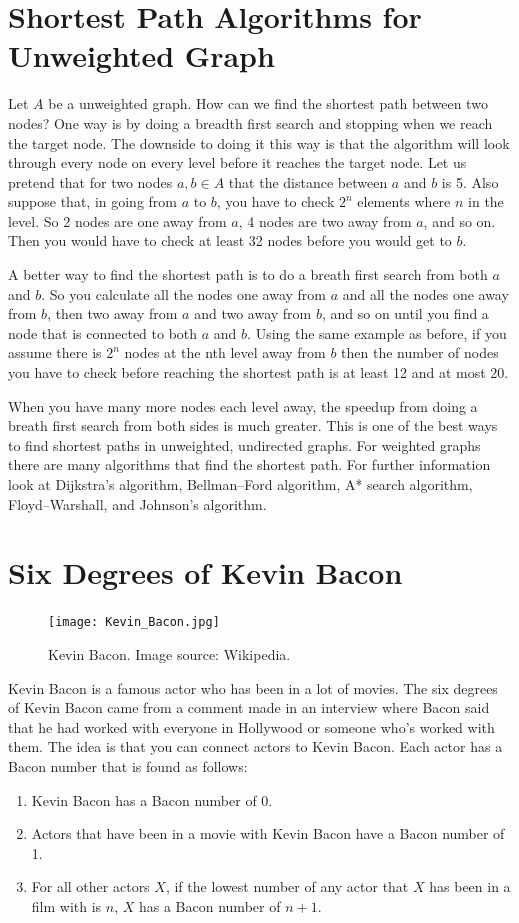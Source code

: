 \section*{Shortest Path Algorithms for Unweighted Graph}
Let $A$ be a unweighted graph. How can we find the shortest path between two nodes?  One way is by doing a breadth first search and stopping when we reach the target node. The downside to doing it this way is that the algorithm will look through every node on every level before it reaches the target node. Let us pretend that for two nodes $a, b \in A$ that the distance between $a$ and $b$ is 5. Also suppose that, in going from $a$ to $b$, you have to check $2^n$ elements where $n$ in the level. So 2 nodes are one away from $a$, 4 nodes are two away from $a$, and so on. Then you would have to check at least 32 nodes before you would get to $b$.

A better way to find the shortest path is to do a breath first search from both $a$ and $b$. So you calculate all the nodes one away from $a$ and all the nodes one away from $b$, then two away from $a$ and two away from $b$, and so on until you find a node that is connected to both $a$ and $b$. Using the same example as before, if you assume there is $2^n$ nodes at the nth level away from $b$ then the number of nodes you have to check before reaching the shortest path is at least 12 and at most 20.

When you have many more nodes each level away, the speedup from doing a breath first search from both sides is much greater. This is one of the best ways to find shortest paths in unweighted, undirected graphs. For weighted graphs there are many algorithms that find the shortest path. For further information look at Dijkstra's algorithm, Bellman–Ford algorithm, A* search algorithm, Floyd–Warshall, and Johnson's algorithm.

\section*{Six Degrees of Kevin Bacon}
\begin{figure}[h]
\texttt{[image: Kevin\_Bacon.jpg]}
\caption{Kevin Bacon.  Image source: Wikipedia.}
\end{figure}

Kevin Bacon is a famous actor who has been in a lot of movies. The six degrees of Kevin Bacon came from a comment made in an interview where Bacon said that he had worked with everyone in Hollywood or someone who's worked with them.  The idea is that you can connect actors to Kevin Bacon. Each actor has a Bacon number that is found as follows:
\begin{enumerate}
\item Kevin Bacon has a Bacon number of 0.
\item Actors that have been in a movie with Kevin Bacon have a Bacon number of 1.
\item For all other actors $X$, if the lowest number of any actor that $X$ has been in a film with is $n$, $X$ has a Bacon number of $n+1$.
\end{enumerate}

